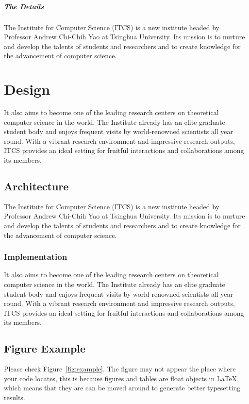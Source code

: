 \documentclass{ics}
\begin{document}
\subparagraph{The Details}
\label{sec:details-1}
The Institute for Computer Science (ITCS) is a new institute headed by Professor
Andrew Chi-Chih Yao at Tsinghua University. Its mission is to nurture and
develop the talents of students and researchers and to create knowledge for the
advancement of computer science. 

\section{Design}
\label{sec:design}
It also aims to become one of the leading research centers on theoretical
computer science in the world. The Institute already has an elite graduate
student body and enjoys frequent visits by world-renowned scientists all year
round. With a vibrant research environment and impressive research outputs, ITCS
provides an ideal setting for fruitful interactions and collaborations among its
members.

\subsection{Architecture}
\label{sec:architecture}
The Institute for Computer Science (ITCS) is a new institute headed by Professor
Andrew Chi-Chih Yao at Tsinghua University. Its mission is to nurture and
develop the talents of students and researchers and to create knowledge for the
advancement of computer science.

\subsubsection{Implementation}
\label{sec:implementation}
It also aims to become one of the leading research centers on theoretical
computer science in the world. The Institute already has an elite graduate
student body and enjoys frequent visits by world-renowned scientists all year
round. With a vibrant research environment and impressive research outputs, ITCS
provides an ideal setting for fruitful interactions and collaborations among its
members.

\subsection{Figure Example}
\label{sec:ref-figure}
Please check Figure~\ref{fig:example}. The figure may not appear the place where
your code locates, this is because figures and tables are float objects in
\LaTeX, which means that they are can be moved around to generate better
typesetting results.
\end{document}

